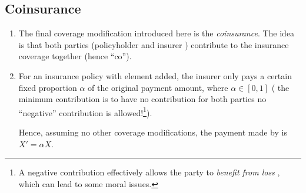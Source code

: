 \subsection{Coinsurance}
\begin{enumerate}
\item The final coverage modification introduced here is the
\emph{coinsurance}. The idea is that both parties (policyholder 
and insurer ) contribute to the insurance coverage together
(hence ``co'').

\item For an insurance policy with  element added, the
insurer  only pays a certain fixed proportion \(\alpha\) of
the original payment amount, where \(\alpha\in[0,1]\) ( the
minimum contribution is to have no contribution for both parties
 no ``negative'' contribution is allowed!\footnote{A
negative contribution effectively allows the party to \emph{benefit from loss
}, which can lead to some moral issues.}).

Hence, assuming no other coverage modifications, the payment made by
 is \(X'=\alpha X\).
\end{enumerate}
